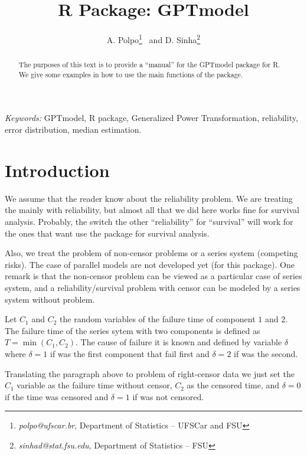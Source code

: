 \documentclass[nogin,letterpaper,12pt]{article}
\title{R Package: GPTmodel}
\author{A. Polpo\footnote{{\it polpo@ufscar.br}, Department of Statistics -- UFSCar and FSU} ~and D. Sinha\footnote{{\it sinhad@stat.fsu.edu}, Department of Statistics -- FSU}}
\begin{document}
\maketitle

\begin{abstract}
The purposes of this text is to provide a ``manual'' for the GPTmodel package for R. We give some examples in how to use the main functions of the package.
\end{abstract}

{\it Keywords:} GPTmodel, R package, Generalized Power Transformation, reliability, error distribution, median estimation.

\section{Introduction}
\label{intro}

We assume that the reader know about the reliability problem. We are treating the mainly with reliability, but almost all that we did here works fine for survival analysis. Probably, the switch the other ``reliability'' for ``survival'' will work for the ones that want use the package for survival analysis.

Also, we treat the problem of non-censor problems or a series system (competing risks). The case of parallel models are not developed yet (for this package). One remark is that the non-censor problem can be viewed as a particular case of series system, and a reliability/survival problem with censor can be modeled by a series system without problem.

Let $C_1$ and $C_2$ the random variables of the failure time of component $1$ and $2$. The failure time of the series sytem with two components is defined as $T = \min(C_1,C_2)$. The cause of failure it is known and defined by variable $\delta$ where $\delta = 1$ if was the first component that fail first and $\delta = 2$ if was the second.

Translating the paragraph above to problem of right-censor data we just set the $C_1$ variable as the failure time without censor, $C_2$ as the censored time, and $\delta = 0$ if the time was censored and $\delta = 1$ if was not censored.
\end{document}
